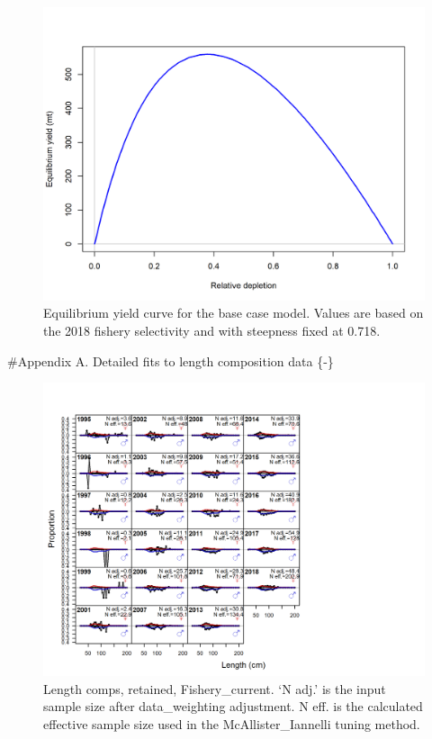 \documentclass[12pt,]{article}
\begin{document}
\begin{figure}
\centering
\includegraphics{r4ss/plots_mod1/yield1_yield_curve.png}
\caption{Equilibrium yield curve for the base case model. Values are
based on the 2018 fishery selectivity and with steepness fixed at 0.718.
\label{fig:yield1_yield_curve}}
\end{figure}

\FloatBarrier

\newpage

\FloatBarrier
\newpage

\#Appendix A. Detailed fits to length composition data \{-\}
\renewcommand{\thepage}{A-\arabic{page}}

\renewcommand{\thefigure}{A\arabic{figure}}
\setcounter{page}{1}

\begin{figure}
\centering
\includegraphics{./r4ss/plots_mod1/comp_lenfit_flt1mkt2.png}
\caption{Length comps, retained, Fishery\_current. `N adj.' is the input
sample size after data\_weighting adjustment. N eff. is the calculated
effective sample size used in the McAllister\_Iannelli tuning method.
\label{fig:mod1_1_comp_lenfit_flt1mkt2}}
\end{figure}
\end{document}

